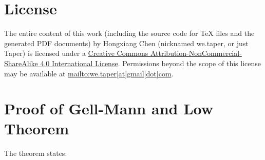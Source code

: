 \documentclass{article}
\numberwithin{equation}{subsection} %
\begin{document}
%	
%	
%
%
%
%	
%	
%	
%	

\section{License}
The entire content of this work (including the source code
for TeX files and the generated PDF documents) by 
Hongxiang Chen (nicknamed we.taper, or just Taper) is
licensed under a 
\href{http://creativecommons.org/licenses/by-nc-sa/4.0/}{Creative 
Commons Attribution-NonCommercial-ShareAlike 4.0 International 
License}. Permissions beyond the scope of this 
license may be available at \url{mailto:we.taper[at]gmail[dot]com}.

\appendix %

\section{Proof of Gell-Mann and Low Theorem}
\label{appendix:Proof_of_G-M_Low}
The theorem states:
\end{document}
